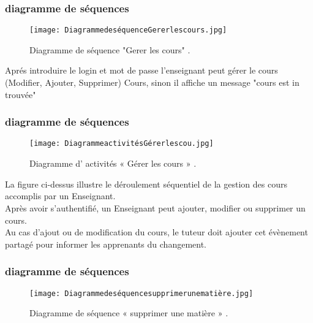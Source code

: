 \subsubsection{diagramme de séquences }
\begin{figure}[ht]
	\centering
	\texttt{[image: DiagrammedeséquenceGererlescours.jpg]}
	\caption{Diagramme de séquence "Gerer les cours" .}
	\label{fig:Diagramme de séquence "Gerer les cours"  }
\end{figure}
\FloatBarrier

Aprés introduire le login et mot de passe l’enseignant peut gérer le cours (Modifier, Ajouter,
Supprimer) Cours, sinon il affiche un message "cours est in trouvée"


\subsubsection{diagramme de séquences }
\begin{figure}[ht]
	\centering
	\texttt{[image: DiagrammeactivitésGérerlescou.jpg]}
	\caption{Diagramme d' activités « Gérer les cours » .}
	\label{fig:Diagramme d' activités  Gérer les cours  }
\end{figure}
\FloatBarrier

La figure ci-dessus illustre le déroulement séquentiel de la gestion des cours accomplis par un Enseignant.\\
Après avoir s’authentifié, un Enseignant peut ajouter, modifier ou supprimer un cours.\\
Au cas d’ajout ou de modification du cours, le tuteur doit ajouter cet évènement  partagé pour informer les apprenants du changement.






\subsubsection{diagramme de séquences }
\begin{figure}[ht]
	\centering
	\texttt{[image: Diagrammedeséquencesupprimerunematière.jpg]}
	\caption{ Diagramme de séquence « supprimer une matière » .}
	\label{fig: Diagramme de séquence  supprimer une matière   }
\end{figure}
\FloatBarrier

